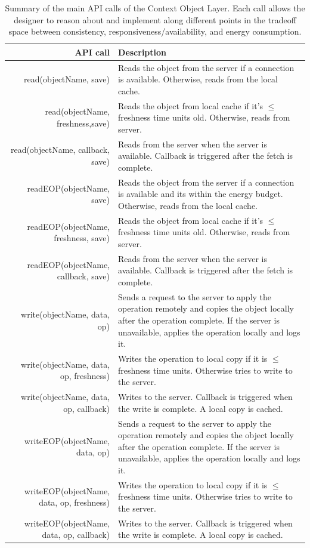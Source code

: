 \begin{table}
\begin{center}
  \begin{tabular}{| r | p{9cm}  | }
    \hline
    {\bf API call } & {\bf Description }  \\ \hline
    read(objectName, save) & Reads the object from the server if a connection is available.  Otherwise, reads from the local cache. \\ \hline
    read(objectName, freshness,save) & Reads the object from local cache if it's $\leq$ freshness time units old.  Otherwise, reads from server. \\ \hline
    read(objectName, callback, save) & Reads from the server when the server is available.  Callback is triggered after the fetch is complete. \\ \hline
    readEOP(objectName, save) & Reads the object from the server if a connection is available and its within the energy budget.  Otherwise, reads from the local cache. \\ \hline
    readEOP(objectName, freshness, save) & Reads the object from local cache if it's $\leq$ freshness time units old.  Otherwise, reads from server. \\ \hline
    readEOP(objectName, callback, save) & Reads from the server when the server is available.  Callback is triggered after the fetch is complete. \\ \hline
    write(objectName, data, op) & Sends a request to the server to apply the operation remotely and copies the object locally after the operation complete.  If the server is unavailable, applies the operation locally and logs it. \\ \hline
    write(objectName, data, op, freshness) & Writes the operation to local copy if it is $\leq$ freshness time units.  Otherwise tries to write to the server. \\ \hline
    write(objectName, data, op, callback) & Writes to the server.  Callback is triggered when the write is complete.  A local copy is cached. \\
    \hline
    writeEOP(objectName, data, op) & Sends a request to the server to apply the operation remotely and copies the object locally after the operation complete.  If the server is unavailable, applies the operation locally and logs it. \\ \hline
    writeEOP(objectName, data, op, freshness) & Writes the operation to local copy if it is $\leq$ freshness time units.  Otherwise tries to write to the server. \\ \hline
    writeEOP(objectName, data, op, callback) & Writes to the server.  Callback is triggered when the write is complete.  A local copy is cached. \\
    \hline
  \end{tabular}
\caption{Summary of the main API calls of the Context Object Layer.  Each call allows the designer to reason about and implement
along different points in the tradeoff space between consistency, responsiveness/availability, and energy consumption.}
\label{tab:api}
\end{center}
\end{table}

